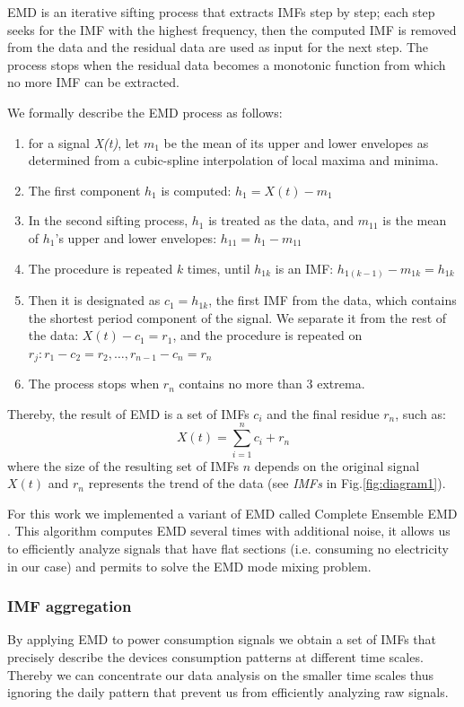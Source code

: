 EMD is an iterative sifting process that extracts IMFs step by step; each step seeks for the IMF with the highest frequency, then the computed IMF is removed from the data and the residual data are used as input for the next step.
The process stops when the residual data becomes a monotonic function from which no more IMF can be extracted.

We formally describe the EMD process as follows: 
\begin{enumerate}
\item for a signal \emph{X(t)}, let $m_1$ be the mean of its upper and lower envelopes as determined from a cubic-spline interpolation of local maxima and minima.
\item The first component $h_1$ is computed: $h_1=X(t)-m_1$
\item In the second sifting process, $h_1$ is treated as the data, and $m_{11}$ is the mean of $h_1$'s upper and lower envelopes: $h_{11}=h_1-m_{11}$
\item The procedure is repeated $k$ times, until $h_{1k}$ is an IMF: $h_{1(k-1)}-m_{1k}=h_{1k}$
\item Then it is designated as $c_1=h_{1k}$, the first IMF from the data, which contains the shortest period component of the signal. We separate it from the rest of the data: $X(t)-c_1 = r_1$, and the procedure is
repeated on $r_j: r_1-c_2 = r_2,\dots,r_{n-1} - c_n = r_n$
\item The process stops when $r_n$ contains no more than 3 extrema.
\end{enumerate}

Thereby, the result of EMD is a set of IMFs $c_i$ and the final residue $r_n$, such as: \[X(t)=\sum^{n}_{i=1}c_i+r_n\]
where the size of the resulting set of IMFs $n$ depends on the original signal $X(t)$ and $r_n$ represents the trend of the data (see \emph{IMFs} in Fig.\ref{fig:diagram1}).

For this work we implemented a variant of EMD called Complete Ensemble EMD \cite{torres:icassp2012}.
This algorithm computes EMD several times with additional noise, it allows us to efficiently analyze signals that have flat sections (i.e. consuming no electricity in our case) and permits to solve the EMD mode mixing problem.

\subsubsection{IMF aggregation} \label{methodo:corr}
By applying EMD to power consumption signals we obtain a set of IMFs that precisely describe the devices consumption patterns at different time scales.
Thereby we can concentrate our data analysis on the smaller time scales thus ignoring the daily pattern that prevent us from efficiently analyzing raw signals.

